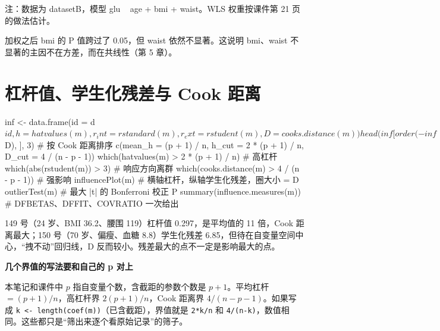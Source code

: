 \begin{studysource}
注：数据为 datasetB，模型 glu ~ age + bmi + waist。WLS 权重按课件第 21 页的做法估计。
\end{studysource}

加权之后 bmi 的 P 值跨过了 0.05，但 waist 依然不显著。这说明 bmi、waist 不显著的主因不在方差，而在共线性（第 5 章）。

\section{杠杆值、学生化残差与 Cook 距离}
\label{sec:influence}
\begin{rcode}[R · 影响度量]
inf <- data.frame(id = d$id, h = hatvalues(m), r_int = rstandard(m),
                  r_ext = rstudent(m), D = cooks.distance(m))
head(inf[order(-inf$D), ], 3)                    # 按 Cook 距离排序
c(mean_h = (p + 1) / n, h_cut = 2 * (p + 1) / n, D_cut = 4 / (n - p - 1))
which(hatvalues(m) > 2 * (p + 1) / n)            # 高杠杆
which(abs(rstudent(m)) > 3)                      # 响应方向离群
which(cooks.distance(m) > 4 / (n - p - 1))       # 强影响
influencePlot(m)                                 # 横轴杠杆，纵轴学生化残差，圈大小 = D
outlierTest(m)                                   # 最大 |t| 的 Bonferroni 校正 P
summary(influence.measures(m))                   # DFBETAS、DFFIT、COVRATIO 一次给出
\end{rcode}
149 号（24 岁、BMI 36.2、腰围 119）杠杆值 0.297，是平均值的 11 倍，Cook 距离最大；150 号（70 岁、偏瘦、血糖 8.8）学生化残差 6.85，但待在自变量空间中心，“拽不动”回归线，D 反而较小。残差最大的点不一定是影响最大的点。


\begin{studyexplain}
\textbf{几个界值的写法要和自己的 p 对上}


本笔记和课件中 $p$ 指自变量个数，含截距的参数个数是 $p+1$。平均杠杆 $=(p+1)/n$，高杠杆界 $2(p+1)/n$，Cook 距离界 $4/(n-p-1)$。如果写成 \Verb|k <- length(coef(m))|（已含截距），界值就是 \Verb|2*k/n| 和 \Verb|4/(n-k)|，数值相同。这些都只是“筛出来逐个看原始记录”的筛子。

\end{studyexplain}


